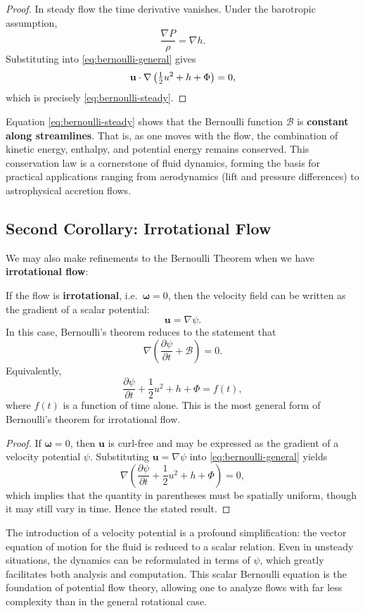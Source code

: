 \begin{proof}
In steady flow the time derivative vanishes. Under the barotropic assumption,
\[
\frac{\nabla P}{\rho} = \nabla h.
\]
Substituting into \eqref{eq:bernoulli-general} gives
\[
{\bf u} \cdot \nabla \left( \tfrac{1}{2}u^2 + h + \Phi \right) = 0,
\]
which is precisely \eqref{eq:bernoulli-steady}.
\end{proof}
\vspace{0.5cm}

Equation \eqref{eq:bernoulli-steady} shows that the Bernoulli function $\mathcal{B}$ is \textbf{constant along streamlines}. That is, as one moves with the flow, the combination of kinetic energy, enthalpy, and potential energy remains conserved. This conservation law is a cornerstone of fluid dynamics, forming the basis for practical applications ranging from aerodynamics (lift and pressure differences) to astrophysical accretion flows.

\subsection{Second Corollary: Irrotational Flow}

We may also make refinements to the Bernoulli Theorem when we have \textbf{irrotational flow}:
\vspace{0.5cm}
\begin{corollary}
If the flow is \textbf{irrotational}, i.e.\ $\boldsymbol{\omega} = 0$, then the velocity field can be written as the gradient of a scalar potential:
\[
\mathbf{u} = \nabla \psi.
\]
In this case, Bernoulli’s theorem reduces to the statement that
\[
\nabla\left(\frac{\partial \psi}{\partial t} + \mathcal{B}\right) = 0.
\]
Equivalently,
\[
\frac{\partial \psi}{\partial t} + \frac{1}{2}u^2 + h + \Phi = f(t),
\]
where $f(t)$ is a function of time alone. This is the most general form of Bernoulli’s theorem for irrotational flow.
\end{corollary}
\begin{proof}
If $\boldsymbol{\omega} = 0$, then $\mathbf{u}$ is curl-free and may be expressed as the gradient of a velocity potential $\psi$. Substituting $\mathbf{u} = \nabla \psi$ into \eqref{eq:bernoulli-general} yields
\[
\nabla\!\left(\frac{\partial \psi}{\partial t} + \frac{1}{2}u^2 + h + \Phi \right) = 0,
\]
which implies that the quantity in parentheses must be spatially uniform, though it may still vary in time. Hence the stated result.
\end{proof}
\vspace{0.5cm}
The introduction of a velocity potential is a profound simplification: the vector equation of motion for the fluid is reduced to a scalar relation. Even in unsteady situations, the dynamics can be reformulated in terms of $\psi$, which greatly facilitates both analysis and computation. This scalar Bernoulli equation is the foundation of potential flow theory, allowing one to analyze flows with far less complexity than in the general rotational case.

